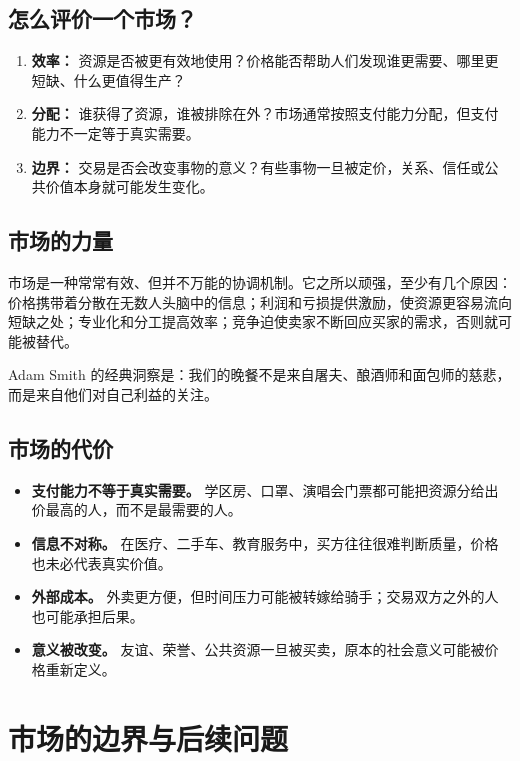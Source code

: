 \documentclass[10pt,a4paper]{ctexart}
\begin{document}
\subsection{怎么评价一个市场？}

\begin{enumerate}
  \item \textbf{效率：} 资源是否被更有效地使用？价格能否帮助人们发现谁更需要、哪里更短缺、什么更值得生产？
  \item \textbf{分配：} 谁获得了资源，谁被排除在外？市场通常按照支付能力分配，但支付能力不一定等于真实需要。
  \item \textbf{边界：} 交易是否会改变事物的意义？有些事物一旦被定价，关系、信任或公共价值本身就可能发生变化。
\end{enumerate}

\subsection{市场的力量}

市场是一种常常有效、但并不万能的协调机制。它之所以顽强，至少有几个原因：价格携带着分散在无数人头脑中的信息；利润和亏损提供激励，使资源更容易流向短缺之处；专业化和分工提高效率；竞争迫使卖家不断回应买家的需求，否则就可能被替代。

Adam Smith 的经典洞察是：我们的晚餐不是来自屠夫、酿酒师和面包师的慈悲，而是来自他们对自己利益的关注。

\subsection{市场的代价}

\begin{itemize}
  \item \textbf{支付能力不等于真实需要。} 学区房、口罩、演唱会门票都可能把资源分给出价最高的人，而不是最需要的人。
  \item \textbf{信息不对称。} 在医疗、二手车、教育服务中，买方往往很难判断质量，价格也未必代表真实价值。
  \item \textbf{外部成本。} 外卖更方便，但时间压力可能被转嫁给骑手；交易双方之外的人也可能承担后果。
  \item \textbf{意义被改变。} 友谊、荣誉、公共资源一旦被买卖，原本的社会意义可能被价格重新定义。
\end{itemize}

\section{市场的边界与后续问题}
\end{document}
